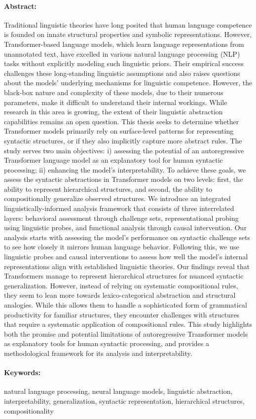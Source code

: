 \paragraph{Abstract:} Traditional linguistic theories have long posited that human language competence is founded on innate structural properties and symbolic representations. However, Transformer-based language models, which learn language representations from unannotated text, have excelled in various natural language processing (NLP) tasks without explicitly modeling such linguistic priors. Their empirical success challenges these long-standing linguistic assumptions and also raises questions about the models' underlying mechanisms for linguistic competence. However, the black-box nature and complexity of these models, due to their numerous parameters, make it difficult to understand their internal workings. While research in this area is growing, the extent of their linguistic abstraction capabilities remains an open question. This thesis seeks to determine whether Transformer models primarily rely on surface-level patterns for representing syntactic structures, or if they also implicitly capture more abstract rules. The study serves two main objectives: i) assessing the potential of an autoregressive Transformer language model as an explanatory tool for human syntactic processing; ii) enhancing the model's interpretability. To achieve these goals, we assess the syntactic abstractions in Transformer models on two levels: first, the ability to represent hierarchical structures, and second, the ability to compositionally generalize observed structures. We introduce an integrated linguistically-informed analysis framework that consists of three interrelated layers: behavioral assessment through challenge sets, representational probing using linguistic probes, and functional analysis through causal intervention. 
Our analysis starts with assessing the model's performance on syntactic challenge sets to see how closely it mirrors human language behavior. Following this, we use linguistic probes and causal interventions to assess how well the model's internal representations align with established linguistic theories. 
Our findings reveal that Transformers manage to represent hierarchical structures for nuanced syntactic generalization. However, instead of relying on systematic compositional rules, they seem to lean more towards lexico-categorical abstraction and structural analogies. While this allows them to handle a sophisticated form of grammatical productivity for familiar structures, they encounter challenges with structures that require a systematic application of compositional rules. This study highlights both the promise and potential limitations of autoregressive Transformer models as explanatory tools for human syntactic processing, and provides a methodological framework for its analysis and interpretability.
%

\paragraph{Keywords:} natural language processing, neural language models, linguistic abstraction, interpretability,  generalization, syntactic representation, hierarchical structures, compositionality




